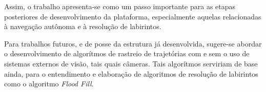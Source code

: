     Assim, o trabalho apresenta-se como um passo importante para as etapas posteriores de desenvolvimento da plataforma, especialmente aquelas relacionadas à navegação autônoma e à resolução de labirintos.

    Para trabalhos futuros, e de posse da estrutura já desenvolvida, sugere-se abordar o desenvolvimento de algorítmos de rastreio de trajetórias com e sem o uso de sistemas externos de visão, tais quais câmeras. Tais algorítmos serviriam de base ainda, para o entendimento e elaboração de algoritmos de resolução de labirintos como o algoritmo \textit{Flood Fill}.

    







